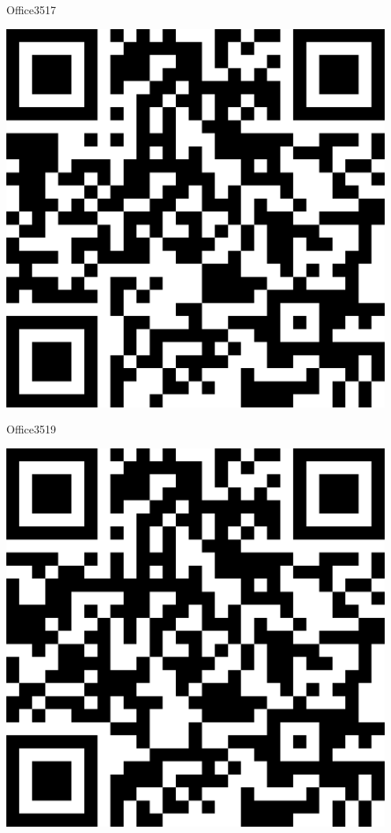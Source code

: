 \documentclass[letterpaper]{article}
\begin{document}
 \hfill{\small Office3517} 

 \vspace{1in} 
 \pagebreak 
{} 
 \vspace*{\fill} 
 \begingroup 
 \centerline{\includegraphics[scale=1,width=5in,height=5in]{Office3519.png}} 
 \endgroup 
 \vspace*{\fill} 

 \hfill{\small Office3519} 

 \vspace{1in} 
 \pagebreak 
{} 
 \vspace*{\fill} 
 \begingroup 
 \centerline{\includegraphics[scale=1,width=5in,height=5in]{Office3521.png}} 
 \endgroup 
 \vspace*{\fill} 
\end{document}

